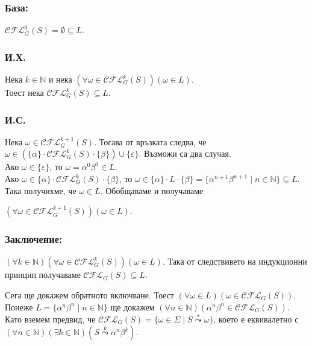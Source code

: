 \documentclass[12pt]{article}
\begin{document}
\subsubsection*{База:}
\(\mathcal{CFL}_G^0(S) = \emptyset \subseteq L\).

\subsubsection*{И.Х.}
Нека \(k \in \mathbb N\) и нека \((\forall \omega \in \mathcal{CFL}_G^k(S))(\omega \in L  )\). \\
Тоест нека \(\mathcal{CFL}_G^k(S) \subseteq L\).

\subsubsection*{И.С.}
Нека \(\omega \in \mathcal{CFL}_G^{k + 1}(S)\). Тогава от връзката следва, че \\
\(\omega \in (\{\alpha\} \cdot \mathcal{CFL}_G^k(S) \cdot \{\beta\}) \cup \{\varepsilon\}\).
Възможи са два случая. \\
Ако \(\omega \in \{\varepsilon\}\), то \(\omega = \alpha^0\beta^0 \in L\). \\
Ако \(\omega \in \{\alpha\} \cdot \mathcal{CFL}_G^k(S) \cdot \{\beta\}\), то \(\omega \in \{\alpha\} \cdot L \cdot \{\beta\} = \{\alpha^{n + 1} \beta^{n + 1} \mid n \in \mathbb N\} \subseteq L\).
Така получихме, че \(\omega \in L\).
Обобщаваме и получаваме

\((\forall \omega \in \mathcal{CFL}_G^{k + 1}(S))(\omega \in L)\).

\subsubsection*{Заключение:}
\((\forall k \in \mathbb N)(\forall \omega \in \mathcal{CFL}_G^k(S))(\omega \in L )\).
Така от следствивето на индукционни принцип получаваме \(\mathcal{CFL}_G(S) \subseteq L\).

\vspace*{5mm}

\par Сега ще докажем обратното включване. Тоест \((\forall \omega \in L)(\omega \in \mathcal{CFL}_G(S))\).
Понеже \(L= \{\alpha^n \beta^n \mid n \in \mathbb N\}\) ще докажем 
\((\forall n \in \mathbb N)(\alpha^n \beta^n \in \mathcal{CFL}_G(S))\).
Като вземем предвид, че \(\mathcal{CFL}_G(S) = \{\omega \in \Sigma \mid S \overset{*}{\leadsto} \omega \}\),
което е еквивалетно с \((\forall n \in \mathbb N)(\exists k \in \mathbb N)(S \overset{k}{\leadsto} \alpha^n \beta^k)\).
\end{document}
